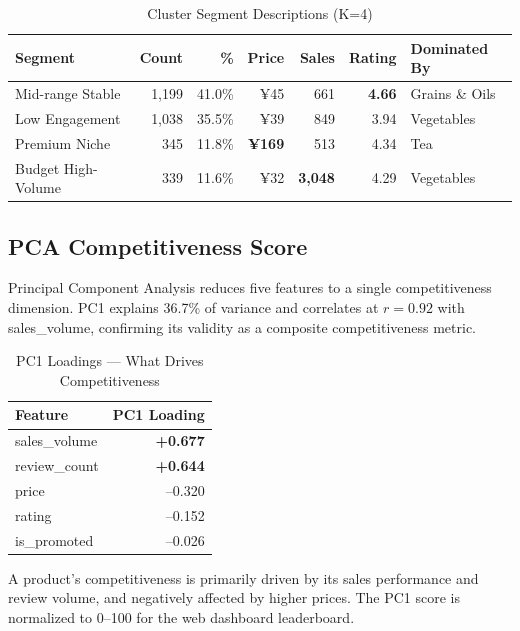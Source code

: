 \documentclass[12pt,a4paper]{report}
\begin{document}
\begin{table}[H]
  \centering
  \caption{Cluster Segment Descriptions (K=4)}
  \begin{tabular}{@{}lrrrrrl@{}}
    \toprule
    \textbf{Segment} & \textbf{Count} & \textbf{\%} & \textbf{Price} & \textbf{Sales} & \textbf{Rating} & \textbf{Dominated By} \\
    \midrule
    Mid-range Stable    & 1,199 & 41.0\% & ¥45  & 661   & \textbf{4.66} & Grains \& Oils \\
    Low Engagement      & 1,038 & 35.5\% & ¥39  & 849   & 3.94  & Vegetables \\
    Premium Niche       & 345   & 11.8\% & \textbf{¥169} & 513   & 4.34  & Tea \\
    Budget High-Volume  & 339   & 11.6\% & ¥32  & \textbf{3,048} & 4.29  & Vegetables \\
    \bottomrule
  \end{tabular}
\end{table}

\subsection{PCA Competitiveness Score}

Principal Component Analysis reduces five features to a single competitiveness dimension. PC1 explains 36.7\% of variance and correlates at $r = 0.92$ with sales\_volume, confirming its validity as a composite competitiveness metric.

\begin{table}[H]
  \centering
  \caption{PC1 Loadings --- What Drives Competitiveness}
  \begin{tabular}{@{}lr@{}}
    \toprule
    \textbf{Feature} & \textbf{PC1 Loading} \\
    \midrule
    sales\_volume  & \textbf{+0.677} \\
    review\_count  & \textbf{+0.644} \\
    price          & --0.320 \\
    rating         & --0.152 \\
    is\_promoted   & --0.026 \\
    \bottomrule
  \end{tabular}
\end{table}

A product's competitiveness is primarily driven by its sales performance and review volume, and negatively affected by higher prices. The PC1 score is normalized to 0--100 for the web dashboard leaderboard.
\end{document}
